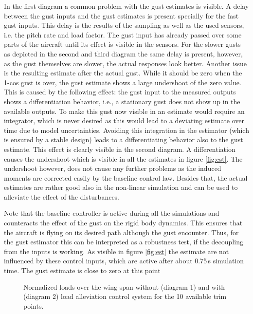 \documentclass[graybox]{svmult}
\begin{document}
In the first diagram a common problem with the gust estimates is visible. A  delay between the gust inputs and the gust estimates is present specially for the fast gust inputs. This delay is the results of the sampling as well as the used sensors, i.e. the pitch rate and load factor. The gust input has already passed over some parts of the aircraft until its effect is visible in the sensors. For the slower gusts as depicted in the second and third diagram the same delay is present, however, as the gust themselves are slower, the actual responses look better.
Another issue is the resulting estimate after the actual gust. While it should be zero when the 1-cos gust is over, the gust estimate shows a large undershoot of the zero value. This is caused by the following effect: the gust input to the measured outputs shows a differentiation behavior, i.e., a stationary gust does not show up in the available outputs. To make this gust now visible in an estimate would require an integrator, which is never desired as this would lead to a deviating estimate over time due to model uncertainties. Avoiding this integration in the estimator (which is ensured by a stable design) leads to a differentiating behavior also to the gust estimate. This effect is clearly visible in the second diagram. A differentiation causes the undershoot which is visible in all the estimates in figure  \ref{fig:est}. The undershoot however, does not cause any further problems as the induced moments are corrected easily by the baseline control law.
Besides that, the actual estimates are rather good also in the non-linear simulation and can be used to alleviate the effect of the disturbances.

Note that the baseline controller is active during all the simulations and counteracts the effect of the gust on the rigid body dynamics. This ensures that the aircraft is flying on its desired path although the gust encounter. Thus, for the gust estimator this can be interpreted as a robustness test, if the decoupling from the inputs is working. As visible in figure \ref{fig:est} the estimate are not influenced by these control inputs, which are active after about 0.75\,s simulation time. The gust estimate is close to zero at this point

\begin{figure}[bth]
	\sidecaption[]
	
	\caption{Normalized loads over the wing span without (diagram 1) and with (diagram 2) load alleviation control system  for the 10 available trim points.}
	\label{fig:loads}	
\end{figure}
\end{document}
